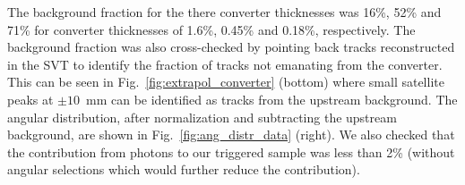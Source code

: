 The background fraction for the there converter thicknesses was 16\%, 52\% and 71\% 
for converter thicknesses of 1.6\%, 0.45\% and 0.18\%, respectively. The background fraction was also 
cross-checked by pointing back tracks reconstructed in the SVT to identify the fraction of tracks not emanating from the converter. This can be seen in Fig.~\ref{fig:extrapol_converter} (bottom) where small 
satellite peaks at $\pm 10$~mm can be identified as tracks from the upstream background. The angular distribution, after normalization and subtracting the upstream background, are shown in 
Fig.~\ref{fig:ang_distr_data} (right).  We also checked that the contribution from photons to our triggered 
sample was less than 2\% (without angular selections which would further reduce the contribution).


